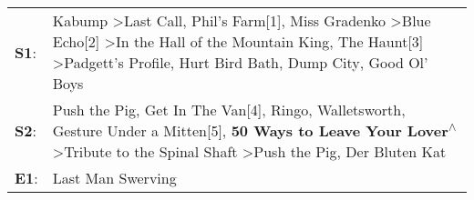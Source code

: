 \begin{supertabular}{p{0.03\textwidth}p{0.92\textwidth}}
 \textbf{S1}:  &  Kabump\textsuperscript{} \textgreater \enspace Last Call\textsuperscript{}, \enspace Phil's Farm[1]\textsuperscript{}, \enspace Miss Gradenko\textsuperscript{} \textgreater \enspace Blue Echo[2]\textsuperscript{} \textgreater \enspace In the Hall of the Mountain King\textsuperscript{}, \enspace The Haunt[3]\textsuperscript{} \textgreater \enspace Padgett's Profile\textsuperscript{}, \enspace Hurt Bird Bath\textsuperscript{}, \enspace Dump City\textsuperscript{}, \enspace Good Ol' Boys\textsuperscript{}  \enspace  \\
 \textbf{S2}:  &                                                                   Push the Pig\textsuperscript{}, \enspace Get In The Van[4]\textsuperscript{}, \enspace Ringo\textsuperscript{}, \enspace Walletsworth\textsuperscript{}, \enspace Gesture Under a Mitten[5]\textsuperscript{}, \enspace \textbf{50 Ways to Leave Your Lover\textsuperscript{$\wedge$}} \textgreater \enspace Tribute to the Spinal Shaft\textsuperscript{} \textgreater \enspace Push the Pig\textsuperscript{}, \enspace Der Bluten Kat\textsuperscript{}  \enspace  \\
 \textbf{E1}:  &                                                                                                                                                                                                                                                                                                                                                                                                                                                                                          Last Man Swerving\textsuperscript{}  \enspace  \\
\end{supertabular}
